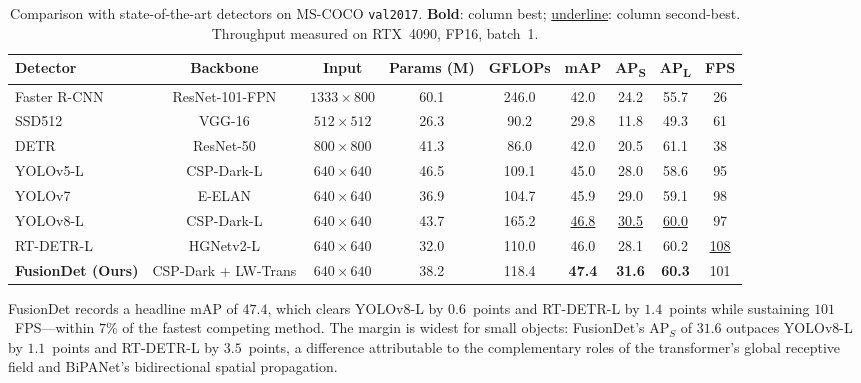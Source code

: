 \begin{table}[!t]
\centering
\caption{Comparison with state-of-the-art detectors on MS-COCO
\texttt{val2017}. \textbf{Bold}: column best;
\underline{underline}: column second-best.
Throughput measured on RTX~4090, FP16, batch~1.}
\label{tab:sota}
\renewcommand{\arraystretch}{1.18}
\setlength{\tabcolsep}{5pt}
\begin{tabular}{l c c c c c c c c}
\hline\hline
\textbf{Detector} &
\textbf{Backbone} &
\textbf{Input} &
\textbf{Params (M)} &
\textbf{GFLOPs} &
\textbf{mAP} &
\textbf{AP\textsubscript{S}} &
\textbf{AP\textsubscript{L}} &
\textbf{FPS} \\
\hline
Faster R-CNN \cite{ren2015faster}
    & ResNet-101-FPN & $1333\!\times\!800$ & 60.1 & 246.0 & 42.0 & 24.2 & 55.7 &  26 \\
SSD512 \cite{liu2016ssd}
    & VGG-16         & $512\!\times\!512$  & 26.3 &  90.2 & 29.8 & 11.8 & 49.3 &  61 \\
DETR \cite{carion2020end}
    & ResNet-50      & $800\!\times\!800$  & 41.3 &  86.0 & 42.0 & 20.5 & 61.1 &  38 \\
YOLOv5-L \cite{jocher2022yolov5}
    & CSP-Dark-L     & $640\!\times\!640$  & 46.5 & 109.1 & 45.0 & 28.0 & 58.6 &  95 \\
YOLOv7 \cite{wang2023yolov7}
    & E-ELAN         & $640\!\times\!640$  & 36.9 & 104.7 & 45.9 & 29.0 & 59.1 &  98 \\
YOLOv8-L \cite{jocher2023yolov8}
    & CSP-Dark-L     & $640\!\times\!640$  & 43.7 & 165.2 & \underline{46.8} & \underline{30.5} & \underline{60.0} &  97 \\
RT-DETR-L \cite{lv2023detrs}
    & HGNetv2-L      & $640\!\times\!640$  & 32.0 & 110.0 & 46.0 & 28.1 & 60.2 & \underline{108} \\
\hline
\textbf{FusionDet (Ours)}
    & CSP-Dark + LW-Trans & $640\!\times\!640$ & 38.2 & 118.4
    & \textbf{47.4} & \textbf{31.6} & \textbf{60.3} & 101 \\
\hline\hline
\end{tabular}
\end{table}

FusionDet records a headline mAP of $47.4$, which clears YOLOv8-L
by $0.6$~points and RT-DETR-L by $1.4$~points while sustaining
$101$~FPS—within $7\%$ of the fastest competing method. The margin is widest
for small objects: FusionDet's $\text{AP}_{S}$ of $31.6$ outpaces YOLOv8-L
by $1.1$~points and RT-DETR-L by $3.5$~points, a difference attributable to
the complementary roles of the transformer's global receptive field and
BiPANet's bidirectional spatial propagation.

